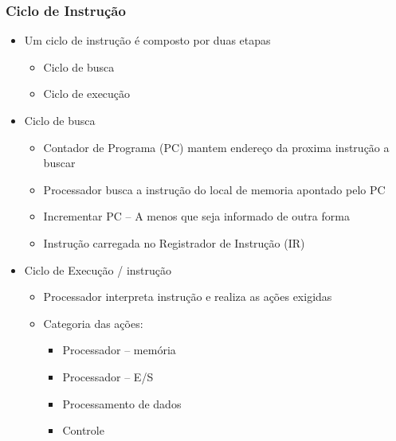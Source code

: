 \documentclass[12pt]{article}
\begin{document}
        \subsubsection{Ciclo de Instrução}
        \begin{itemize}
            \item Um ciclo de instrução é composto por duas etapas
            \begin{itemize}
                \item Ciclo de busca
                \item Ciclo de execução
            \end{itemize}
            \item Ciclo de busca
            \begin{itemize}
                \item Contador de Programa (PC) mantem endereço da proxima 
                instrução a buscar
                \item Processador busca a instrução do local de memoria 
                apontado pelo PC
                \item Incrementar PC -- A menos que seja informado de outra 
                forma
                \item Instrução carregada no Registrador de Instrução (IR)
            \end{itemize}
            \item Ciclo de Execução / instrução
            \begin{itemize}
                \item Processador interpreta instrução e realiza as ações 
                exigidas
                \item Categoria das ações:
                    \begin{itemize}
                        \item Processador -- memória
                        \item Processador -- E/S
                        \item Processamento de dados
                        \item Controle
                    \end{itemize}
            \end{itemize}
        \end{itemize}
\end{document}
